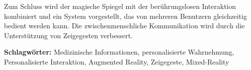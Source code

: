 Zum Schluss wird der magische Spiegel mit der berührungslosen Interaktion kombiniert und ein System vorgestellt, das von mehreren Benutzern gleichzeitig bedient werden kann. Die zwischenmenschliche Kommunikation wird durch die Unterstützung von Zeigegesten verbessert.

\textbf{Schlagwörter:} Medizinische Informationen, personalisierte Wahrnehmung, Personalisierte Interaktion, Augmented Reality, Zeigegeste, Mixed-Reality


%
%
